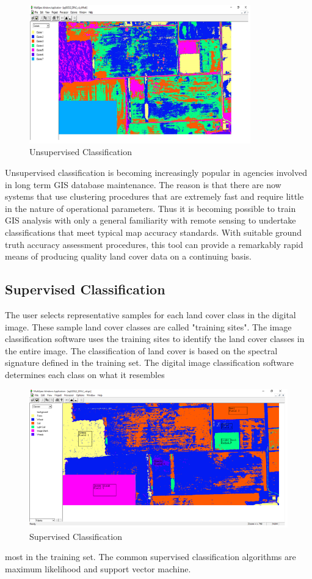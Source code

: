 \documentclass[document.tex]{subfiles}
\begin{document}
\begin{figure}[H]
	\begin{center}
		\includegraphics[height=6.0cm]{imgs/Unsupervised.png}
	\end{center}
	\caption{Unsupervised Classification}
	\label{fig: Unsupervised Classification}
\end{figure}
Unsupervised classification is becoming increasingly popular in agencies involved in
long term GIS database maintenance. The reason is that there are now systems that use
clustering procedures that are extremely fast and require little in the nature of operational parameters. Thus it is becoming possible to train GIS analysis with only a general
familiarity with remote sensing to undertake classifications that meet typical map accuracy standards. With suitable ground truth accuracy assessment procedures, this tool can provide a remarkably rapid means of producing quality land cover data on a continuing basis.

\subsection{Supervised Classification}
\noindent The user selects representative samples for each land cover class in the digital image.
These sample land cover classes are called "training sites". The image classification
software uses the training sites to identify the land cover classes in the entire image.
The classification of land cover is based on the spectral signature defined in the training set. The digital image classification software determines each class on what it resembles
\begin{figure}[H]
	\begin{center}
		\includegraphics[height=6.0cm]{imgs/Supervised.png}
	\end{center}
	\caption{Supervised Classification}
	\label{fig: Supervised Classification}
\end{figure}
most in the training set. The common supervised classification algorithms are maximum
likelihood\cite{19} and support vector machine\cite{18}.
\end{document}
